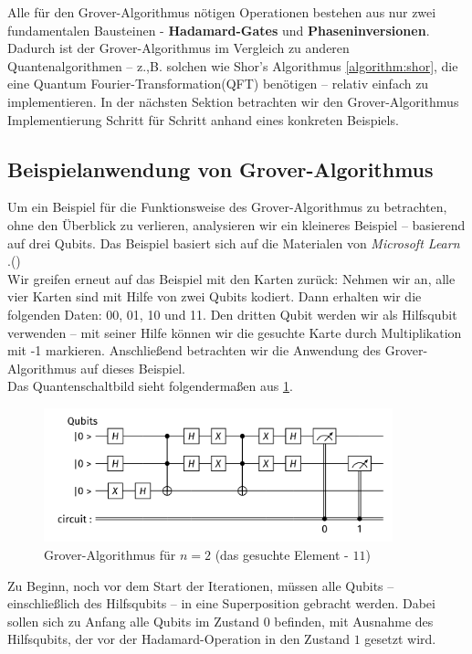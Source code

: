 {Alle für den Grover-Algorithmus nötigen Operationen bestehen aus nur zwei fundamentalen Bausteinen - \textbf{Hadamard-Gates} und \textbf{Phaseninversionen}. Dadurch ist der Grover-Algorithmus im Vergleich zu anderen Quantenalgorithmen – z.,B. solchen wie Shor's Algorithmus \ref{algorithm:shor}, die eine Quantum Fourier-Transformation(QFT) benötigen – relativ einfach zu implementieren. In der nächsten Sektion betrachten wir den Grover-Algorithmus Implementierung Schritt für Schritt anhand eines konkreten Beispiels.

\subsection{Beispielanwendung von Grover-Algorithmus}

Um ein Beispiel für die Funktionsweise des Grover-Algorithmus zu betrachten, ohne den Überblick zu verlieren, analysieren wir ein kleineres Beispiel – basierend auf drei Qubits. Das Beispiel basiert sich auf die Materialen von \textit{Microsoft Learn
}.(\cite{noauthor_theory_2025})\\ 

Wir greifen erneut auf das Beispiel mit den Karten zurück: Nehmen wir an, alle vier Karten sind mit Hilfe von zwei Qubits kodiert. Dann erhalten wir die folgenden Daten: 00, 01, 10 und 11. Den dritten Qubit werden wir als Hilfsqubit  verwenden – mit seiner Hilfe können wir die gesuchte Karte durch Multiplikation mit -1 markieren. Anschließend betrachten wir die Anwendung des Grover-Algorithmus auf dieses Beispiel.\\

Das Quantenschaltbild sieht folgendermaßen aus \ref{fig:grover-three-bits}.
\begin{figure}[h!]
    \centering
    \includegraphics[width=0.9\textwidth]{images/basic-algorithms/3-qubits-grover.png}
    \caption{Grover-Algorithmus für $n=2$ (das gesuchte Element - $11$)}
    \label{fig:grover-three-bits}
\end{figure}

Zu Beginn, noch vor dem Start der Iterationen, müssen alle Qubits – einschließlich des Hilfsqubits – in eine Superposition gebracht werden. Dabei sollen sich zu Anfang alle Qubits im Zustand $0$ befinden, mit Ausnahme des Hilfsqubits, der vor der Hadamard-Operation in den Zustand $1$ gesetzt wird.\\

}

